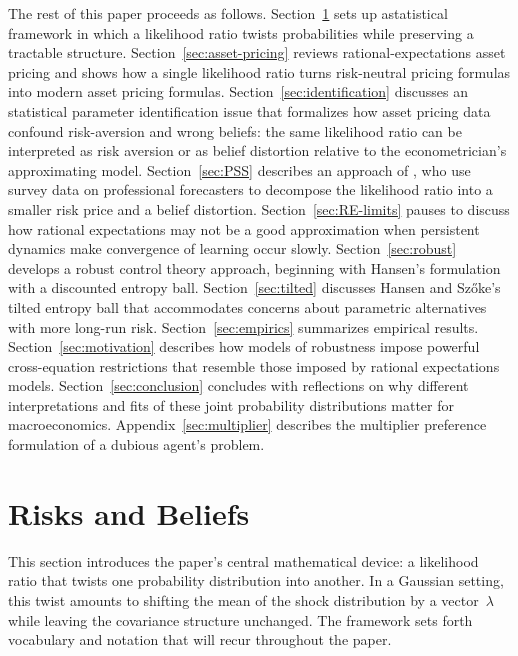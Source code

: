 \documentclass[12pt]{article}
\theoremstyle{definition}
\begin{document}
The rest of this paper proceeds as follows.  Section~\ref{sec:risks-and-beliefs}
sets up astatistical framework in which a likelihood ratio twists
probabilities while preserving a tractable structure.
Section~\ref{sec:asset-pricing} reviews rational-expectations asset
pricing and shows how a single likelihood ratio turns risk-neutral
pricing formulas into modern asset pricing formulas.
Section~\ref{sec:identification} discusses an statistical  parameter identification issue that formalizes how
asset pricing data confound risk-aversion and wrong beliefs:
the same likelihood ratio can be interpreted as risk aversion or as
belief distortion relative to the econometrician's approximating model. Section~\ref{sec:PSS} describes an approach of
\citet{PSS2015}, who use survey data on
professional forecasters to decompose the likelihood ratio into a
smaller risk price and a belief distortion.
Section~\ref{sec:RE-limits} pauses to discuss how  rational expectations
may not be a good approximation when persistent dynamics make convergence
of learning occur slowly.
Section~\ref{sec:robust} develops a robust control theory approach,
beginning with Hansen's formulation with a discounted entropy ball. Section~\ref{sec:tilted}
discusses Hansen and Sz\H{o}ke's tilted entropy ball that
accommodates concerns about parametric alternatives with more long-run
risk.  Section~\ref{sec:empirics} summarizes empirical results. Section~\ref{sec:motivation} describes how models 
of robustness impose powerful cross-equation restrictions that resemble those imposed by rational expectations models.
Section~\ref{sec:conclusion} concludes with reflections on why different interpretations and fits of these
joint probability distributions matter for macroeconomics. Appendix~\ref{sec:multiplier} describes the multiplier preference formulation of a dubious agent's problem.


\section{Risks and Beliefs}
\label{sec:risks-and-beliefs}

This section introduces the paper's central mathematical device: a
likelihood ratio that twists one probability distribution into another.
In a Gaussian setting, this twist amounts to shifting the mean of the
shock distribution by a vector~$\lambda$ while leaving the covariance
structure unchanged.  The  framework sets forth vocabulary and notation that will recur
throughout the paper.
\end{document}
